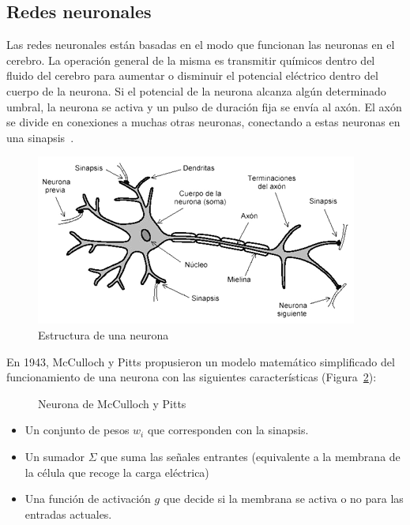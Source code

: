 \subsection{Redes neuronales}

Las redes neuronales están basadas en el modo que funcionan las neuronas en el cerebro. La operación general de la misma es transmitir químicos dentro del fluido del cerebro para aumentar o disminuir el potencial eléctrico dentro del cuerpo de la neurona. Si el potencial de la neurona alcanza algún determinado umbral, la neurona se activa y un pulso de duración fija se envía al axón. El axón se divide en conexiones a muchas otras neuronas, conectando a estas neuronas en una sinapsis~\cite[pág 11]{Marsland:2009:MLA:1571643}.\\

\begin{figure}[tbph!]
\centering
\includegraphics[width=0.7\linewidth]{imagenes/neurona.png}
\caption{Estructura de una neurona}
\label{fig:neurona}
\end{figure}

En 1943, McCulloch y Pitts propusieron un modelo matemático simplificado del funcionamiento de una neurona con las siguientes características (Figura~\ref{fig:mccullochpitts}):

\begin{figure}[htbp!]
\centering
\neuronaMcCullochPitts
\caption{Neurona de McCulloch y Pitts}
\label{fig:mccullochpitts}
\end{figure}

\begin{itemize}
	\item Un conjunto de pesos $w_i$ que corresponden con la sinapsis.
	\item Un sumador $\Sigma$ que suma las señales entrantes (equivalente a la membrana de la célula que recoge la carga eléctrica)
	\item Una función de activación $g$ que decide si la membrana se activa o no para las entradas actuales. 
\end{itemize} 

